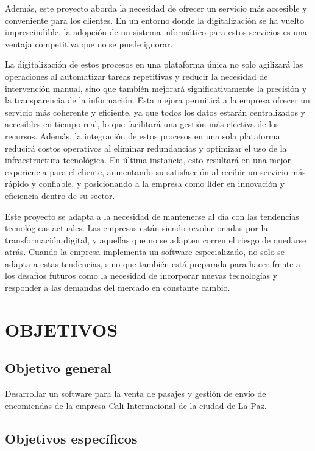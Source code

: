\documentclass[12pt,letterpaper]{article}
\begin{document}
Además, este proyecto aborda la necesidad de ofrecer un servicio más accesible y conveniente para los clientes. En un entorno donde la digitalización se ha vuelto imprescindible, la adopción de un sistema informático para estos servicios es una ventaja competitiva que no se puede ignorar.

La digitalización de estos procesos en una plataforma única no solo agilizará las operaciones al automatizar tareas repetitivas y reducir la necesidad de intervención manual, sino que también mejorará significativamente la precisión y la transparencia de la información. Esta mejora permitirá a la empresa ofrecer un servicio más coherente y eficiente, ya que todos los datos estarán centralizados y accesibles en tiempo real, lo que facilitará una gestión más efectiva de los recursos. Además, la integración de estos procesos en una sola plataforma reducirá costos operativos al eliminar redundancias y optimizar el uso de la infraestructura tecnológica. En última instancia, esto resultará en una mejor experiencia para el cliente, aumentando su satisfacción al recibir un servicio más rápido y confiable, y posicionando a la empresa como líder en innovación y eficiencia dentro de su sector.

Este proyecto se adapta a la necesidad de mantenerse al día con las tendencias tecnológicas actuales. Las empresas están siendo revolucionadas por la transformación digital, y aquellas que no se adapten corren el riesgo de quedarse atrás. Cuando la empresa implementa un software especializado, no solo se adapta a estas tendencias, sino que también está preparada para hacer frente a los desafíos futuros como la necesidad de incorporar nuevas tecnologías y responder a las demandas del mercado en constante cambio.

\section{OBJETIVOS}

\subsection{Objetivo general}

Desarrollar un software para la venta de pasajes y gestión de envío de encomiendas de la empresa Cali Internacional de la ciudad de La Paz.

\subsection{Objetivos específicos}
\end{document}
